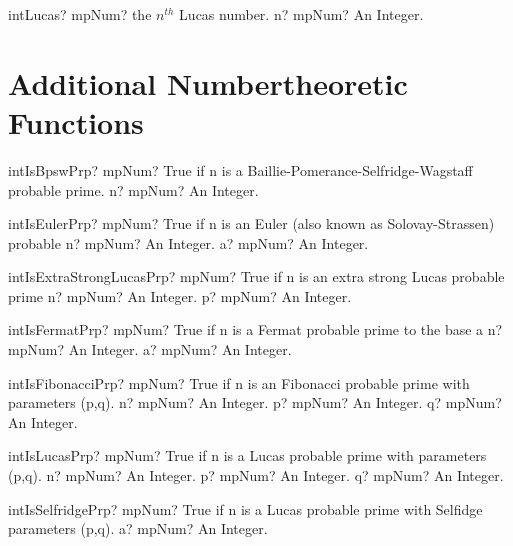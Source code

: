 \documentclass[12pt,a4paper,openany]{book}
\begin{document}
\begin{mpFunctionsExtract}
\mpFunctionOne
{intLucas? mpNum? the $n^{th}$ Lucas number.}
{n? mpNum? An Integer.}
\end{mpFunctionsExtract}

\section{Additional Numbertheoretic Functions}

\begin{mpFunctionsExtract}
\mpFunctionOne
{intIsBpswPrp? mpNum? True if n is a Baillie-Pomerance-Selfridge-Wagstaff probable prime.}
{n? mpNum? An Integer.}
\end{mpFunctionsExtract}

\begin{mpFunctionsExtract}
\mpFunctionTwo
{intIsEulerPrp? mpNum? True if n is an Euler (also known as Solovay-Strassen) probable}
{n? mpNum? An Integer.}
{a? mpNum? An Integer.}
\end{mpFunctionsExtract}

\begin{mpFunctionsExtract}
\mpFunctionTwo
{intIsExtraStrongLucasPrp? mpNum? True if n is an extra strong Lucas probable prime}
{n? mpNum? An Integer.}
{p? mpNum? An Integer.}
\end{mpFunctionsExtract}

\begin{mpFunctionsExtract}
\mpFunctionTwo
{intIsFermatPrp? mpNum? True if n is a Fermat probable prime to the base a}
{n? mpNum? An Integer.}
{a? mpNum? An Integer.}
\end{mpFunctionsExtract}

\begin{mpFunctionsExtract}
\mpFunctionThree
{intIsFibonacciPrp? mpNum? True if n is an Fibonacci probable prime with parameters (p,q).}
{n? mpNum? An Integer.}
{p? mpNum? An Integer.}
{q? mpNum? An Integer.}
\end{mpFunctionsExtract}

\begin{mpFunctionsExtract}
\mpFunctionThree
{intIsLucasPrp? mpNum? True if n is a Lucas probable prime with parameters (p,q).}
{n? mpNum? An Integer.}
{p? mpNum? An Integer.}
{q? mpNum? An Integer.}
\end{mpFunctionsExtract}

\begin{mpFunctionsExtract}
\mpFunctionOne
{intIsSelfridgePrp? mpNum? True if n is a Lucas probable prime with Selfidge parameters (p,q).}
{a? mpNum? An Integer.}
\end{mpFunctionsExtract}
\end{document}
